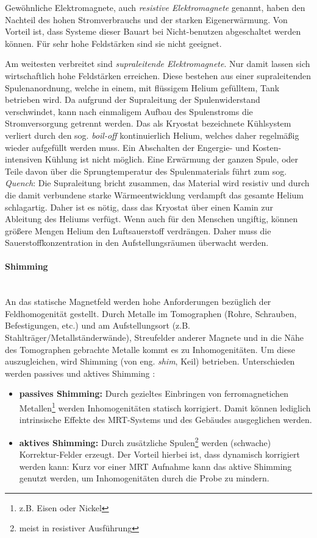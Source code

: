Gewöhnliche Elektromagnete, auch \textit{resistive Elektromagnete} genannt, haben den Nachteil des hohen Stromverbrauchs und der starken Eigenerwärmung. Von Vorteil ist, dass Systeme dieser Bauart bei Nicht-benutzen abgeschaltet werden können. Für sehr hohe Feldstärken sind sie nicht geeignet.

Am weitesten verbreitet sind \textit{supraleitende Elektromagnete}. Nur damit lassen sich wirtschaftlich hohe Feldstärken erreichen. Diese bestehen aus einer supraleitenden Spulenanordnung, welche in einem, mit flüssigem Helium gefülltem, Tank betrieben wird. Da aufgrund der Supraleitung der Spulenwiderstand verschwindet, kann nach einmaligem Aufbau des Spulenstroms die Stromversorgung getrennt werden. Das als Kryostat bezeichnete Kühlsystem verliert durch den sog. \textit{boil-off} kontinuierlich Helium, welches daher regelmäßig wieder aufgefüllt werden muss. Ein Abschalten der Engergie- und Kosten-intensiven Kühlung ist nicht möglich. Eine Erwärmung der ganzen Spule, oder Teile davon über die Sprungtemperatur des Spulenmaterials führt zum sog. \textit{Quench}: Die Supraleitung bricht zusammen, das Material wird resistiv und durch die damit verbundene starke Wärmeentwicklung verdampft das gesamte Helium schlagartig. Daher ist es nötig, dass das Kryostat über einen Kamin zur Ableitung des Heliums verfügt. Wenn auch für den Menschen ungiftig, können größere Mengen Helium den Luftsauerstoff verdrängen. Daher muss die Sauerstoffkonzentration in den Aufstellungsräumen überwacht werden.


\paragraph{Shimming}\mbox{}\\
An das statische Magnetfeld werden hohe Anforderungen bezüglich der Feldhomogenität gestellt.
Durch Metalle im Tomographen (Rohre, Schrauben, Befestigungen, etc.) und am Aufstellungsort (z.B. Stahlträger/Metallständerwände), Streufelder anderer Magnete und in die Nähe des Tomographen gebrachte Metalle kommt es zu Inhomogenitäten.
Um diese auszugleichen, wird Shimming (von eng. \textit{shim}, Keil) betrieben. Unterschieden werden passives und aktives Shimming \cite{Lipton2008}:
\begin{itemize}
	\item \textbf{passives Shimming:} Durch gezieltes Einbringen von ferromagnetichen Metallen\footnote{z.B. Eisen oder Nickel} werden Inhomogenitäten statisch korrigiert. Damit können lediglich intrinsische Effekte des MRT-Systems und des Gebäudes ausgeglichen werden.
	\item \textbf{aktives Shimming:} Durch zusätzliche Spulen\footnote{meist in resistiver Ausführung} werden (schwache) Korrektur-Felder erzeugt. Der Vorteil hierbei ist, dass dynamisch korrigiert werden kann: Kurz vor einer MRT Aufnahme kann das aktive Shimming genutzt werden, um Inhomogenitäten  durch die Probe zu mindern.  
\end{itemize}

